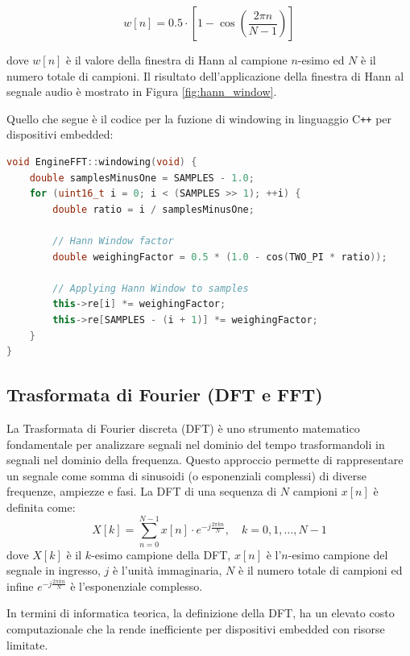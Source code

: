 \documentclass[a4paper,12pt]{report}  %
\begin{document}
\begin{equation}
    w[n] = 0.5 \cdot \left [ 1 - \cos \left( \frac{2 \pi n}{N - 1} \right) \right ] \nonumber
\end{equation}

dove $w[n]$ è il valore della finestra di Hann al campione $n$-esimo ed $N$ è il numero totale di campioni.
Il risultato dell'applicazione della finestra di Hann al segnale audio è mostrato in Figura \ref{fig:hann_window}.

Quello che segue è il codice per la fuzione di windowing in linguaggio C\texttt{++} per dispositivi embedded:

\begin{lstlisting}[language=C++,keywords={void, double, float, this, uint16_t, this, for, cos, TWO_PI}]
void EngineFFT::windowing(void) {
    double samplesMinusOne = SAMPLES - 1.0;
    for (uint16_t i = 0; i < (SAMPLES >> 1); ++i) {
        double ratio = i / samplesMinusOne;
    
        // Hann Window factor
        double weighingFactor = 0.5 * (1.0 - cos(TWO_PI * ratio));
    
        // Applying Hann Window to samples
        this->re[i] *= weighingFactor;
        this->re[SAMPLES - (i + 1)] *= weighingFactor;
    }
}
\end{lstlisting}

\subsection{Trasformata di Fourier (DFT e FFT)}\label{sec:fft}
La Trasformata di Fourier discreta (DFT) è uno strumento matematico fondamentale per analizzare segnali nel dominio del tempo trasformandoli in segnali nel dominio della frequenza.
Questo approccio permette di rappresentare un segnale come somma di sinusoidi (o esponenziali complessi) di diverse frequenze, ampiezze e fasi.
La DFT di una sequenza di $N$ campioni $x[n]$ è definita come:
\begin{equation}
    X[k] = \sum_{n = 0}^{N - 1} x[n] \cdot e^{-j \frac{2 \pi k n}{N}}, \quad k = 0, 1, \ldots, N - 1 \nonumber
\end{equation}
dove $X[k]$ è il $k$-esimo campione della DFT, $x[n]$ è l'$n$-esimo campione del segnale in ingresso, $j$ è l'unità immaginaria, $N$ è il numero totale di campioni ed infine $e^{-j \frac{2 \pi k n}{N}}$ è l'esponenziale complesso.

In termini di informatica teorica, la definizione della DFT, ha un elevato costo computazionale che la rende inefficiente per dispositivi embedded con risorse limitate.
\end{document}
